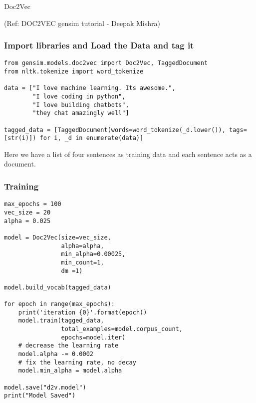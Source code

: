 \begin{frame}[fragile]\frametitle{}

\begin{center}
{\Large Doc2Vec}
\end{center}

{\tiny (Ref: DOC2VEC gensim tutorial - Deepak Mishra)}
\end{frame}

\begin{frame}[fragile]\frametitle{Import libraries and Load the Data and tag it}
\begin{lstlisting}
from gensim.models.doc2vec import Doc2Vec, TaggedDocument
from nltk.tokenize import word_tokenize

data = ["I love machine learning. Its awesome.",
        "I love coding in python",
        "I love building chatbots",
        "they chat amazingly well"]
		
tagged_data = [TaggedDocument(words=word_tokenize(_d.lower()), tags=[str(i)]) for i, _d in enumerate(data)]		
\end{lstlisting}

Here we have a list of four sentences as training data and each sentence acts as a document.

\end{frame}


\begin{frame}[fragile]\frametitle{Training}

\begin{lstlisting}
max_epochs = 100
vec_size = 20
alpha = 0.025

model = Doc2Vec(size=vec_size,
                alpha=alpha, 
                min_alpha=0.00025,
                min_count=1,
                dm =1)
  
model.build_vocab(tagged_data)

for epoch in range(max_epochs):
    print('iteration {0}'.format(epoch))
    model.train(tagged_data,
                total_examples=model.corpus_count,
                epochs=model.iter)
    # decrease the learning rate
    model.alpha -= 0.0002
    # fix the learning rate, no decay
    model.min_alpha = model.alpha

model.save("d2v.model")
print("Model Saved")
\end{lstlisting}
\end{frame}

